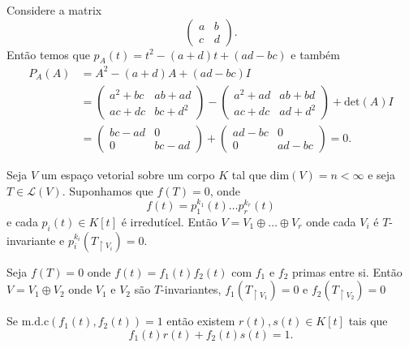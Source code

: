 \documentclass[11pt,twoside,a4paper]{book}
\begin{document}
\begin{exemplo}
Considere a matrix\[\begin{pmatrix}
                    a & b \\ c & d
                    \end{pmatrix}.\]
 Então temos que \(p_A(t)=t^2-(a+d)t+(ad-bc)\) e também
\begin{align*}
P_A(A)&=A^2-(a+d)A+(ad-bc)I\\
      &=
\begin{pmatrix}
                                       a^2+bc & ab+ad\\ac+dc & bc+d^2
                                       \end{pmatrix}
                                                               -\begin{pmatrix} a^2+ad & ab+bd \\ ac+dc & ad+d^2\end{pmatrix} + \text{det}(A)I
                                                                 \\&=\begin{pmatrix}bc-ad & 0 \\ 0 & bc- ad\end{pmatrix} + \begin{pmatrix}ad-bc & 0 \\ 0 & ad - bc\end{pmatrix} = 0.
                                     \end{align*}
                                 \end{exemplo}
\begin{teorema}
Seja \(V\) um espaço vetorial sobre um corpo \(K\) tal que \(\text{dim}(V)=n<\infty\) e seja \(T\in\mathcal{L}(V)\). Suponhamos que \(f(T)=0\), onde \[f(t)=p_1^{k_1}(t)\ldots p_r^{k_r}(t)\] e cada \(p_i(t)\in K[t]\) é irredutícel. Então \(V=V_1\oplus\ldots\oplus V_r\) onde cada \(V_i\) é \(T\)-invariante e \(p_i^{k_i}(T_{\upharpoonright V_i})=0\).
                     \end{teorema}
\begin{lema}
Seja \(f(T)=0\) onde \(f(t)=f_1(t)f_2(t)\) com \(f_1\) e \(f_2\) primas entre si. Então \(V=V_1\oplus V_2\) onde \(V_1\) e \(V_2\) são \(T\)-invariantes, \(f_1(T_{\upharpoonright V_1})=0\) e \(f_2(T_{\upharpoonright V_2})=0\)         \end{lema}
\begin{sublema}
Se \(\text{m.d.c}(f_1(t),f_2(t))=1\) então existem
\mbox{\(r(t),s(t)\in K[t]\)} tais que
                    \[f_1(t)r(t)+f_2(t)s(t)=1.\]                                                            \end{sublema}
\end{document}
